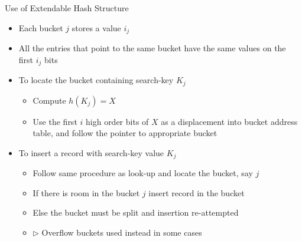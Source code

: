 \documentclass[aspectratio=169, xcolor=dvipsnames]{beamer}
\begin{document}
\begin{frame}{Use of Extendable Hash Structure}
    \begin{itemize}[<+->]
        \item Each bucket $j$ stores a value $i_j$
        \item All the entries that point to the same bucket have the same values on the first $i_j$ bits
        \item To locate the bucket containing search-key $K_j$
        \begin{itemize}[<+->]
            \item Compute $h(K_j) = X$
            \item Use the first $i$ high order bits of $X$ as a displacement into bucket address table, and follow the pointer to appropriate bucket
        \end{itemize}
        \item To insert a record with search-key value $K_j$
        \begin{itemize}[<+->]
            \item Follow same procedure as look-up and locate the bucket, say $j$
            \item If there is room in the bucket $j$ insert record in the bucket
            \item Else the bucket must be split and insertion re-attempted
            \item $\triangleright$ Overflow buckets used instead in some cases
        \end{itemize}
    \end{itemize}
\end{frame}
\end{document}

